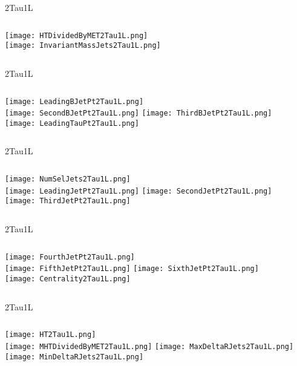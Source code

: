 \documentclass{beamer}
\begin{document}
\begin{frame}{2Tau1L}
    \begin{columns}[t]
    \centering
    \texttt{[image: HTDividedByMET2Tau1L.png]}\\
    \centering
    \texttt{[image: InvariantMassJets2Tau1L.png]}
    \end{columns}
\end{frame}
\begin{frame}{2Tau1L}
    \begin{columns}[t]
    \centering
    \texttt{[image: LeadingBJetPt2Tau1L.png]}\\
    \texttt{[image: SecondBJetPt2Tau1L.png]}
    \centering
    \texttt{[image: ThirdBJetPt2Tau1L.png]}\\
    \texttt{[image: LeadingTauPt2Tau1L.png]}
    \end{columns}
\end{frame}
\begin{frame}{2Tau1L}
    \begin{columns}[t]
    \centering
    \texttt{[image: NumSelJets2Tau1L.png]}\\
    \texttt{[image: LeadingJetPt2Tau1L.png]}
    \centering
    \texttt{[image: SecondJetPt2Tau1L.png]}\\
    \texttt{[image: ThirdJetPt2Tau1L.png]}
    \end{columns}
\end{frame}
\begin{frame}{2Tau1L}
    \begin{columns}[t]
    \centering
    \texttt{[image: FourthJetPt2Tau1L.png]}\\
    \texttt{[image: FifthJetPt2Tau1L.png]}
    \centering
    \texttt{[image: SixthJetPt2Tau1L.png]}\\
    \texttt{[image: Centrality2Tau1L.png]}
    \end{columns}
\end{frame}
\begin{frame}{2Tau1L}
    \begin{columns}[t]
    \centering
    \texttt{[image: HT2Tau1L.png]}\\
    \texttt{[image: MHTDividedByMET2Tau1L.png]}
    \centering
    \texttt{[image: MaxDeltaRJets2Tau1L.png]}\\
    \texttt{[image: MinDeltaRJets2Tau1L.png]}
    \end{columns}
\end{frame}
\end{document}
